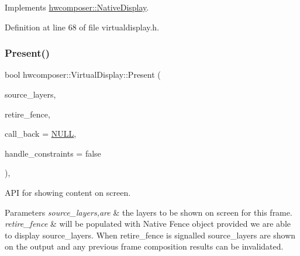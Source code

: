 Implements \mbox{\hyperlink{classhwcomposer_1_1NativeDisplay_af03b22112e421559c5f59837a2209716}{hwcomposer\+::\+Native\+Display}}.



Definition at line 68 of file virtualdisplay.\+h.


\begin{DoxyCode}{0}
\end{DoxyCode}
\mbox{\label{classhwcomposer_1_1VirtualDisplay_ae97c6838a094e32117b496445e0a8c3e}} 
\subsubsection{\texorpdfstring{Present()}{Present()}}
{\footnotesize\ttfamily bool hwcomposer\+::\+Virtual\+Display\+::\+Present (\begin{DoxyParamCaption}\item[{std\+::vector$<$ \mbox{\hyperlink{structhwcomposer_1_1HwcLayer}{Hwc\+Layer}} $\ast$$>$ \&}]{source\+\_\+layers,  }\item[{int32\+\_\+t $\ast$}]{retire\+\_\+fence,  }\item[{\mbox{\hyperlink{classhwcomposer_1_1PixelUploaderCallback}{Pixel\+Uploader\+Callback}} $\ast$}]{call\+\_\+back = {\ttfamily \mbox{\hyperlink{alios_2platformdefines_8h_a070d2ce7b6bb7e5c05602aa8c308d0c4}{N\+U\+LL}}},  }\item[{bool}]{handle\+\_\+constraints = {\ttfamily false} }\end{DoxyParamCaption})\hspace{0.3cm}{\ttfamily [override]}, {\ttfamily [virtual]}}

A\+PI for showing content on screen. 
\begin{DoxyParams}{Parameters}
{\em source\+\_\+layers,are} & the layers to be shown on screen for this frame. \\
\hline
{\em retire\+\_\+fence} & will be populated with Native Fence object provided we are able to display source\+\_\+layers. When retire\+\_\+fence is signalled source\+\_\+layers are shown on the output and any previous frame composition results can be invalidated. \\
\hline
\end{DoxyParams}


